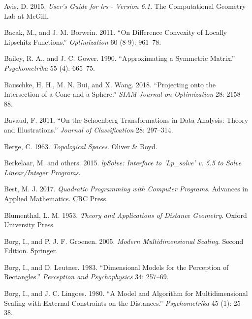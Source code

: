 \documentclass[
  12pt,
  letterpaper,
  DIV=11,
  numbers=noendperiod]{scrreprt}
\newlength{\cslhangindent}
\newenvironment{CSLReferences}[2] %
 {\begin{list}{}{%
  \setlength{\itemindent}{0pt}
  \setlength{\leftmargin}{0pt}
  \setlength{\parsep}{0pt}
  \ifodd #1
   \setlength{\leftmargin}{\cslhangindent}
   \setlength{\itemindent}{-1\cslhangindent}
  \fi
  \setlength{\itemsep}{#2\baselineskip}}}
 {\end{list}}
\theoremstyle{remark}
\begin{document}

\label{refs}
\begin{CSLReferences}{1}{0}
Avis, D. 2015. \emph{{User's Guide for lrs - Version 6.1}}. {The
Computational Geometry Lab at McGill}.

Bacak, M., and J. M. Borwein. 2011. {``{On Difference Convexity of
Locally Lipschitz Functions}.''} \emph{Optimization} 60 (8-9): 961--78.

Bailey, R. A., and J. C. Gower. 1990. {``{Approximating a Symmetric
Matrix}.''} \emph{Psychometrika} 55 (4): 665--75.

Bauschke, H. H., M. N. Bui, and X. Wang. 2018. {``{Projecting onto the
Intersection of a Cone and a Sphere}.''} \emph{SIAM Journal on
Optimization} 28: 2158--88.

Bavaud, F. 2011. {``{On the Schoenberg Transformations in Data Analysis:
Theory and Illustrations}.''} \emph{Journal of Classification} 28:
297--314.

Berge, C. 1963. \emph{Topological Spaces}. Oliver \& Boyd.

Berkelaar, M. and others. 2015. \emph{{lpSolve: Interface to 'Lp\_solve'
v. 5.5 to Solve Linear/Integer Programs}}.

Best, M. J. 2017. \emph{Quadratic Programming with Computer Programs}.
Advances in Applied Mathematics. CRC Press.

Blumenthal, L. M. 1953. \emph{Theory and Applications of Distance
Geometry}. Oxford University Press.

Borg, I., and P. J. F. Groenen. 2005. \emph{Modern Multidimensional
Scaling}. Second Edition. Springer.

Borg, I., and D. Leutner. 1983. {``{Dimensional Models for the
Perception of Rectangles}.''} \emph{Perception and Psychophysics} 34:
257--69.

Borg, I., and J. C. Lingoes. 1980. {``{A Model and Algorithm for
Multidimensional Scaling with External Constraints on the Distances}.''}
\emph{Psychometrika} 45 (1): 25--38.


\end{CSLReferences}
\end{document}
